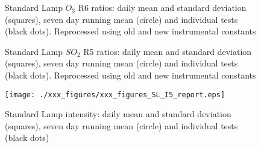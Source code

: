 \begin{figure}[hbtp!]
\begin{center}

  \caption{Standard Lamp $O_3$ R6 ratios: daily mean and standard deviation (squares), seven day running mean (circle) and individual tests (black dots). Reprocessed using old and new instrumental constants}
\label{fig:SL_R6_report}

\end{center}
\end{figure}


\begin{figure}[hbtp!]
\begin{center}

 \caption{Standard Lamp $SO_2$ R5 ratios: daily mean and standard deviation (squares), seven day running mean (circle) and individual tests (black dots). Reprocessed using old and new instrumental constants}
	\label{fig:SL_R5_report}

\end{center}
\end{figure}

\begin{figure}[hbtp!]
\begin{center}
		\texttt{[image: ./xxx\_figures/xxx\_figures\_SL\_I5\_report.eps]}
		\caption{Standard Lamp intensity: daily mean and standard deviation (squares), seven day running mean (circle) and individual tests (black dots)}
		\label{fig:SL_I5_report}
\end{center}
\end{figure}









